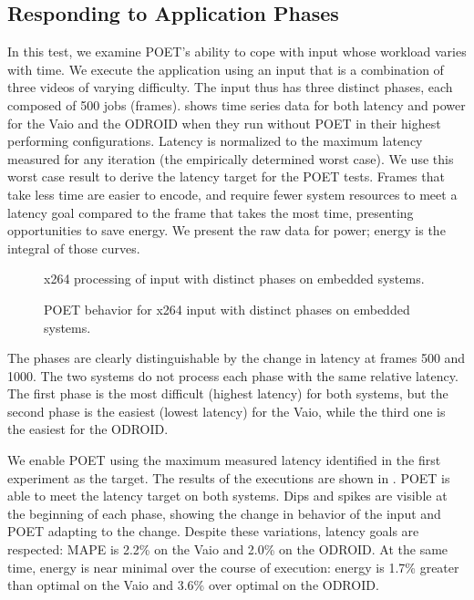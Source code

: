 \subsection{Responding to Application Phases}

In this test, we examine POET's ability to cope with input whose workload varies with time.
We execute the  application using an input that is a combination of three videos of varying difficulty.
The input thus has three distinct phases, each composed of 500 jobs (frames).
 shows time series data for both latency and power for the Vaio and the ODROID when they run without POET in their highest performing configurations.
Latency is normalized to the maximum latency measured for any iteration (\ie the empirically determined worst case).
We use this worst case result to derive the latency target for the POET tests.
Frames that take less time are easier to encode, and require fewer system resources to meet a latency goal compared to the frame that takes the most time, presenting opportunities to save energy.
We present the raw data for power; energy is the integral of those curves.

\begin{figure}[t]
  \centering
  
  \caption{x264 processing of input with distinct phases on embedded systems.}
  \label{fig:poet-embedded-phases-default}
\end{figure}
\begin{figure}[t]
  \centering
      
  \caption{POET behavior for x264 input with distinct phases on embedded systems.}
  \label{fig:poet-embedded-phases-x264}
\end{figure}

The phases are clearly distinguishable by the change in latency at frames 500 and 1000.
The two systems do not process each phase with the same relative latency.
The first phase is the most difficult (highest latency) for both systems, but the second phase is the easiest (lowest latency) for the Vaio, while the third one is the easiest for the ODROID.

We enable POET using the maximum measured latency identified in the first experiment as the target.
The results of the executions are shown in .
POET is able to meet the latency target on both systems.
Dips and spikes are visible at the beginning of each phase, showing the change in behavior of the input and POET adapting to the change.
Despite these variations, latency goals are respected: MAPE is 2.2\% on the Vaio and 2.0\% on the ODROID.
At the same time, energy is near minimal over the course of execution: energy is 1.7\% greater than optimal on the Vaio and 3.6\% over optimal on the ODROID.



